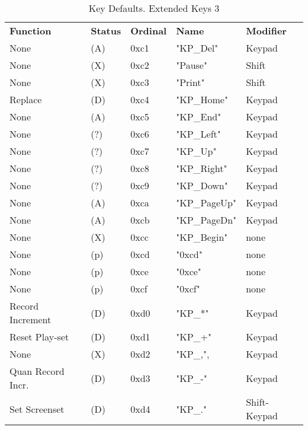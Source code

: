    \begin{table}[htb!]
      \centering
      \caption{Key Defaults. Extended Keys 3}
      \label{table:key_defaults_extended_keys_3}
      \begin{tabular}{l l l l l}
        \textbf{Function} & \textbf{Status} & \textbf{Ordinal} & \textbf{Name} & \textbf{Modifier} \\
        None               & (A)  &  0xc1   & "KP\_Del"    & Keypad \\
        None               & (X)  &  0xc2   & "Pause"      & Shift \\
        None               & (X)  &  0xc3   & "Print"      & Shift \\
        Replace            & (D)  &  0xc4   & "KP\_Home"   & Keypad \\
        None               & (A)  &  0xc5   & "KP\_End"    & Keypad \\
        None               & (?)  &  0xc6   & "KP\_Left"   & Keypad \\
        None               & (?)  &  0xc7   & "KP\_Up"     & Keypad \\
        None               & (?)  &  0xc8   & "KP\_Right"  & Keypad \\
        None               & (?)  &  0xc9   & "KP\_Down"   & Keypad \\
        None               & (A)  &  0xca   & "KP\_PageUp" & Keypad \\
        None               & (A)  &  0xcb   & "KP\_PageDn" & Keypad \\
        None               & (X)  &  0xcc   & "KP\_Begin"  & none \\
        None               & (p)  &  0xcd   & "0xcd"       & none \\
        None               & (p)  &  0xce   & "0xce"       & none \\
        None               & (p)  &  0xcf   & "0xcf"       & none \\
        Record Increment   & (D)  &  0xd0   & "KP\_*"      & Keypad \\
        Reset Play-set     & (D)  &  0xd1   & "KP\_+"      & Keypad \\
        None               & (X)  &  0xd2   & "KP\_,",     & Keypad \\
        Quan Record Incr.  & (D)  &  0xd3   & "KP\_-"      & Keypad \\
        Set Screenset      & (D)  &  0xd4   & "KP\_."      & Shift-Keypad \\

\end{tabular}
\end{table}
